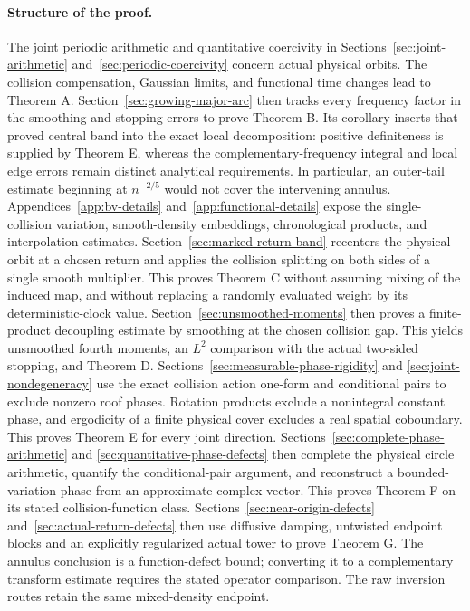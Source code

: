 \documentclass[11pt,reqno]{amsart}
\numberwithin{equation}{section}
\theoremstyle{definition}\newtheorem{definition}[theorem]{Definition}
\theoremstyle{remark}\newtheorem{remark}[theorem]{Remark}
\begin{document}
\paragraph{Structure of the proof.}
The joint periodic arithmetic and quantitative coercivity in
Sections~\ref{sec:joint-arithmetic} and~\ref{sec:periodic-coercivity}
concern actual physical orbits. The collision compensation, Gaussian
limits, and functional time changes lead to Theorem A.
Section~\ref{sec:growing-major-arc} then tracks every frequency factor
in the smoothing and stopping errors to prove Theorem B. Its corollary
inserts that proved central band into the exact local decomposition:
positive definiteness is supplied by Theorem E, whereas the
complementary-frequency integral and local edge errors remain distinct
analytical requirements. In particular, an outer-tail
estimate beginning at $n^{-2/5}$ would not cover the intervening annulus.
Appendices~\ref{app:bv-details} and~\ref{app:functional-details} expose
the single-collision variation, smooth-density embeddings,
chronological products, and interpolation estimates. Section~\ref{sec:marked-return-band} recenters the physical orbit at a
chosen return and applies the collision splitting on both sides of a
single smooth multiplier. This proves Theorem C without assuming
mixing of the induced map, and without replacing a randomly evaluated
weight by its deterministic-clock value. Section~\ref{sec:unsmoothed-moments} then proves a finite-product
decoupling estimate by smoothing at the chosen collision gap. This
yields unsmoothed fourth moments, an $L^2$ comparison with the actual
two-sided stopping, and Theorem D.
Sections~\ref{sec:measurable-phase-rigidity} and
\ref{sec:joint-nondegeneracy} use the exact collision action one-form
and conditional pairs to exclude nonzero roof phases. Rotation products
exclude a nonintegral constant phase, and ergodicity of a finite physical
cover excludes a real spatial coboundary. This proves Theorem E for
every joint direction. Sections~\ref{sec:complete-phase-arithmetic} and
\ref{sec:quantitative-phase-defects} then complete the physical circle
arithmetic, quantify the conditional-pair argument, and reconstruct a
bounded-variation phase from an approximate complex vector. This proves
Theorem F on its stated collision-function class.
Sections~\ref{sec:near-origin-defects} and~\ref{sec:actual-return-defects}
then use diffusive damping, untwisted endpoint blocks and an explicitly
regularized actual tower to prove Theorem G. The annulus conclusion is
a function-defect bound; converting it to a complementary transform
estimate requires the stated operator comparison. The raw inversion
routes retain the same mixed-density endpoint.
\end{document}
